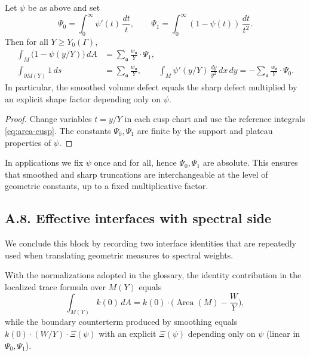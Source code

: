 \begin{lemma}\label{lem:smooth-vol}
Let $\psi$ be as above and set
\[
\Psi_0=\int_0^\infty \psi'(t)\,\frac{dt}{t},\qquad
\Psi_1=\int_0^\infty (1-\psi(t))\,\frac{dt}{t^2}.
\]
Then for all $Y\ge Y_0(\Gamma)$,
\begin{align*}
\int_{M}\big(1-\psi(y/Y)\big)\,dA
&=\sum_{\mathfrak a}\frac{w_{\mathfrak a}}{Y}\cdot \Psi_1,\\
\int_{\partial M(Y)} 1\,ds
&=\sum_{\mathfrak a}\frac{w_{\mathfrak a}}{Y},\qquad
\int_{M}\psi'(y/Y)\,\frac{dy}{y^2}\,dx\,dy
= -\sum_{\mathfrak a}\frac{w_{\mathfrak a}}{Y}\cdot \Psi_0.
\end{align*}
In particular, the smoothed volume defect equals the sharp defect multiplied by
an explicit shape factor depending only on $\psi$.
\end{lemma}

\begin{proof}
Change variables $t=y/Y$ in each cusp chart and use the reference integrals
\eqref{eq:area-cusp}. The constants $\Psi_0,\Psi_1$ are finite by the support
and plateau properties of $\psi$.
\end{proof}

\begin{remark}
In applications we fix $\psi$ once and for all, hence $\Psi_0,\Psi_1$ are absolute.
This ensures that smoothed and sharp truncations are interchangeable at the level
of geometric constants, up to a fixed multiplicative factor.
\end{remark}

\subsection*{A.8. Effective interfaces with spectral side}

\noindent
We conclude this block by recording two interface identities that are repeatedly
used when translating geometric measures to spectral weights.

\begin{lemma}\label{lem:plancherel}
With the normalizations adopted in the glossary, the identity contribution in
the localized trace formula over $M(Y)$ equals
\[
\int_{M(Y)} k(0)\,dA
= k(0)\cdot \Big(\operatorname{Area}(M)- \frac{W}{Y}\Big),
\]
while the boundary counterterm produced by smoothing equals
$k(0)\cdot (W/Y)\cdot \Xi(\psi)$ with an explicit $\Xi(\psi)$ depending only on
$\psi$ (linear in $\Psi_0,\Psi_1$).
\end{lemma}

